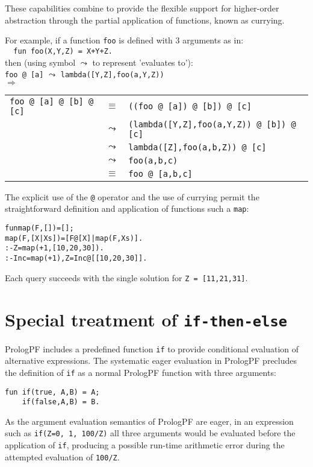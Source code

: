 These capabilities combine to provide the flexible support for
higher-order abstraction through the partial application of functions, known as currying.

For example, if a function \texttt{foo} is defined
with 3 arguments as in:\\
 \texttt{~~fun foo(X,Y,Z) = X+Y+Z.}\\
then (using symbol $\leadsto$ to represent 'evaluates to'):\\
\texttt{foo @ [a]} $\leadsto$ \texttt{lambda([Y,Z],foo(a,Y,Z))}\\
$\Longrightarrow$\\
\begin{tabular}{l l l}
\texttt{foo @ [a] @ [b] @ [c]}
 & $\equiv$   & \texttt{((foo @ [a]) @ [b]) @ [c]}\\
 & $\leadsto$ & \texttt{(lambda([Y,Z],foo(a,Y,Z)) @ [b]) @ [c]}\\
 & $\leadsto$ & \texttt{lambda([Z],foo(a,b,Z)) @ [c]}\\
 & $\leadsto$ & \texttt{foo(a,b,c)}\\
 & $\equiv$   & \texttt{foo @ [a,b,c]}
\end{tabular}

The explicit use of the \texttt{@} operator and the use of currying permit the
straightforward definition and application of functions such a \texttt{map}:
\begin{alltt}
fun map(F,[]) = [];                        % map definition
    map(F,[X|Xs]) = [F @ [X]|map(F,Xs)].\vspace{2mm}
:- Z = map(+1,[10,20,30]).                 % curried +
:- Inc = map(+1), Z = Inc @ [[10,20,30]].  % curried map, +
\end{alltt}
Each query succeeds with the single solution for \texttt{Z = [11,21,31]}.

\section{Special treatment of \texttt{if-then-else}} %
\label{if-then-else}

PrologPF includes a predefined function \texttt{if} to provide conditional
evaluation of alternative expressions.  The systematic eager evaluation in
PrologPF precludes the definition of \texttt{if} as a normal PrologPF function
with three arguments:
\begin{verbatim}
fun if(true, A,B) = A;
    if(false,A,B) = B.
\end{verbatim}
As the argument evaluation semantics of PrologPF are eager,
in an expression such as \texttt{if(Z=0, 1, 100/Z)} all three arguments
would be evaluated before the application of \texttt{if}, producing a
possible
run-time arithmetic error during the attempted evaluation of \texttt{100/Z}.

